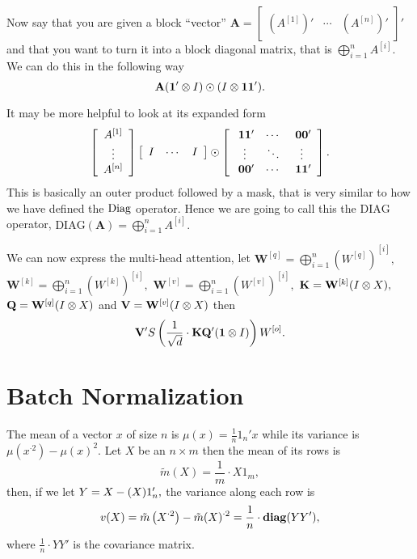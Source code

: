 \documentclass{sapthesis}
\begin{document}
Now say that you are given a block ``vector''  \(\mathbf A =
\left[\begin{array}{ccc}\left(A^{[1]}\right)' & \cdots &
\left(A^{[n]}\right)'\end{array}\right]'\) and that you want to turn it into a
block diagonal matrix, that is \(\bigoplus_{i=1}^n A^{[i]}.\) We can do this in the
following way \[\mathbf A (\mathbf{1}' \otimes I) \odot (I \otimes \mathbf{1} \mathbf{1}').\]

It may be more helpful to look at its expanded form \[
\left[\begin{array}{c}A^{[1]} \\ \vdots \\ A^{[n]}\end{array}\right]
\left[\begin{array}{ccc}I & \cdots & I\end{array}\right]
\hadam
\left[\begin{array}{ccc}
    \phantom{{}'}\vec 1 \vec 1' & \cdots & \Z \\
    \vdots & \ddots & \vdots \\
    \Z & \cdots & \phantom{{}'}\vec 1 \vec 1'
\end{array}\right].
\] This is basically an outer product followed by a mask, that is very similar
to how we have defined the \(\mathrm{Diag}\) operator. Hence we are going to call this
the \(\mathrm{DIAG}\) operator, \(\mathrm{DIAG}(\mathbf{A}) = \bigoplus_{i=1}^n
A^{[i]}.\)

We can now express the multi-head attention, let
\(\mathbf W^{[q]} = \bigoplus_{i=1}^n \left(W^{[q]}\right)^{[i]},\)
\(\mathbf W^{[k]} = \bigoplus_{i=1}^n \left(W^{[k]}\right)^{[i]},\)
\(\mathbf W^{[v]} = \bigoplus_{i=1}^n \left(W^{[v]}\right)^{[i]},\)
\(\mathbf K = \mathbf W^{[k]} (I \otimes X),\)
\(\mathbf Q = \mathbf W^{[q]} (I \otimes X)\) and
\(\mathbf V = \mathbf W^{[v]} (I \otimes X)\)
then \[
\mathbf V'
S\left(
    \frac1{\sqrt{d}}
    \cdot \mathbf K \mathbf Q' (\mathbf{1} \otimes I)
\right)
W^{[o]}.
\]

\iffalse %
\chapter{Batch Normalization}

The mean of a vector \(x\) of size \(n\) is \(\mu(x) = \frac 1 n 1_n' x\) while
its variance is \(\mu(x^{{\cdot}2}) - \mu(x)^2.\) Let \(X\) be an \(n \times m\)
then the mean of its rows is \[\tilde m(X) = \frac 1 m \cdot X 1_m,\] then, if
we let \(Y = X - \title m(X) 1_n',\) the variance along each row is \[v(X) =
\tilde m\left(X^{{\cdot}2}\right) - \tilde m(X)^{{\cdot}2} = \frac 1 n \cdot
\mathbf{diag}(Y Y'),\] where \(\frac 1 n \cdot Y Y'\) is the covariance matrix.
\end{document}

